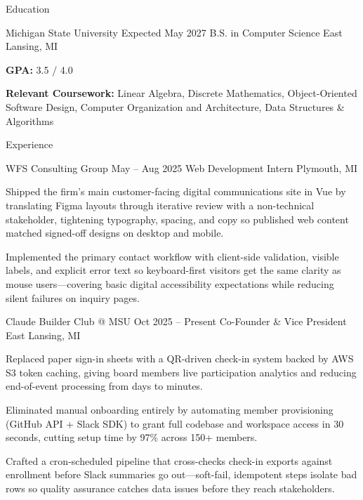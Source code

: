 \documentclass[
	11pt
]{../../../resume}
\begin{document}
	\begin{rSection}{E}{ducation}
		\begin{rSectionEntry}
			{Michigan State University}
			{Expected May 2027}
			{B.S. in Computer Science}
			{}
			{East Lansing, MI}

			\item \textbf{GPA:} 3.5 / 4.0
			\item \textbf{Relevant Coursework:} Linear Algebra, Discrete Mathematics, Object-Oriented Software Design, Computer Organization and Architecture, Data Structures \& Algorithms
		\end{rSectionEntry}
	\end{rSection}

	\begin{rSection}{E}{xperience}
		\begin{rSectionEntry}
			{WFS Consulting Group}
			{May -- Aug 2025}
			{Web Development Intern}
			{}
			{Plymouth, MI}

			\item Shipped the firm's main customer-facing digital communications site in Vue by translating Figma layouts through iterative review with a non-technical stakeholder, tightening typography, spacing, and copy so published web content matched signed-off designs on desktop and mobile.
			\item Implemented the primary contact workflow with client-side validation, visible labels, and explicit error text so keyboard-first visitors get the same clarity as mouse users---covering basic digital accessibility expectations while reducing silent failures on inquiry pages.
		\end{rSectionEntry}

		\begin{rSectionEntry}
			{Claude Builder Club @ MSU}
			{Oct 2025 -- Present}
			{Co-Founder \& Vice President}
			{}
			{East Lansing, MI}

			\item Replaced paper sign-in sheets with a QR-driven check-in system backed by AWS S3 token caching, giving board members live participation analytics and reducing end-of-event processing from days to minutes.
			\item Eliminated manual onboarding entirely by automating member provisioning (GitHub API + Slack SDK) to grant full codebase and workspace access in 30 seconds, cutting setup time by 97\% across 150+ members.
			\item Crafted a cron-scheduled pipeline that cross-checks check-in exports against enrollment before Slack summaries go out---soft-fail, idempotent steps isolate bad rows so quality assurance catches data issues before they reach stakeholders.
		\end{rSectionEntry}
	\end{rSection}
\end{document}
